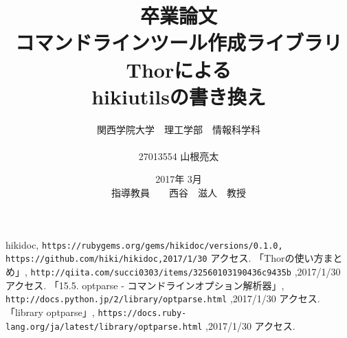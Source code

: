 \documentclass[12pt,a4paper]{jsarticle}
\begin{document}
\title{卒業論文\\
\vspace{4cm} コマンドラインツール作成ライブラリThorによる\\hikiutilsの書き換え}
\author{ 関西学院大学　理工学部　情報科学科\\\\27013554 山根亮太}
\date{\vspace{3cm} 2017年  3月\\
\vspace{3cm} 指導教員　　西谷　滋人　教授}
\maketitle
\setcounter{tocdepth}{4}

\tableofcontents





\begin{thebibliography}{99}
   hikidoc, \verb|https://rubygems.org/gems/hikidoc/versions/0.1.0,| \verb|https://github.com/hiki/hikidoc,2017/1/30| アクセス.
   「Thorの使い方まとめ」, \verb|http://qiita.com/succi0303/items/32560103190436c9435b| ,2017/1/30 アクセス.
   「15.5. optparse - コマンドラインオプション解析器」, \verb|http://docs.python.jp/2/library/optparse.html| ,2017/1/30 アクセス.
   「library optparse」, \verb|https://docs.ruby-lang.org/ja/latest/library/optparse.html| ,2017/1/30 アクセス.
\end{thebibliography}
\end{document}
